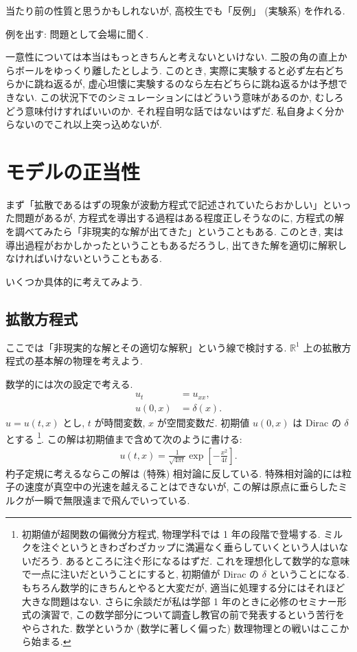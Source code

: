 \documentclass[openany, a4paper, oneside]{jsbook}
\begin{document}
当たり前の性質と思うかもしれないが, 高校生でも「反例」 (実験系) を作れる.

例を出す: 問題として会場に聞く.

一意性については本当はもっときちんと考えないといけない.
二股の角の直上からボールをゆっくり離したとしよう.
このとき, 実際に実験すると必ず左右どちらかに跳ね返るが, 虚心坦懐に実験するのなら左右どちらに跳ね返るかは予想できない.
この状況下でのシミュレーションにはどういう意味があるのか, むしろどう意味付けすればいいのか.
それ程自明な話ではないはずだ.
私自身よく分からないのでこれ以上突っ込めないが.
\section{モデルの正当性}

まず「拡散であるはずの現象が波動方程式で記述されていたらおかしい」といった問題があるが,
方程式を導出する過程はある程度正しそうなのに,
方程式の解を調べてみたら「非現実的な解が出てきた」ということもある.
このとき, 実は導出過程がおかしかったということもあるだろうし,
出てきた解を適切に解釈しなければいけないということもある.

いくつか具体的に考えてみよう.
\subsection{拡散方程式}

ここでは「非現実的な解とその適切な解釈」という線で検討する.
$\mathbb{R}^1$ 上の拡散方程式の基本解の物理を考えよう.

数学的には次の設定で考える.
\begin{align}
 u_t &     = u_{xx}, \\
 u (0, x) & = \delta (x).
\end{align}
$u = u (t,x)$ とし, $t$ が時間変数, $x$ が空間変数だ.
初期値 $u (0, x)$ は Dirac の $\delta$ とする \footnote{初期値が超関数の偏微分方程式, 物理学科では 1 年の段階で登場する.
ミルクを注ぐというときわざわざカップに満遍なく垂らしていくという人はいないだろう.
あるところに注ぐ形になるはずだ.
これを理想化して数学的な意味で一点に注いだということにすると,
初期値が Dirac の $\delta$ ということになる.
もちろん数学的にきちんとやると大変だが, 適当に処理する分にはそれほど大きな問題はない.
さらに余談だが私は学部 1 年のときに必修のセミナー形式の演習で,
この数学部分について調査し教官の前で発表するという苦行をやらされた.
数学というか (数学に著しく偏った) 数理物理との戦いはここから始まる.}.
この解は初期値まで含めて次のように書ける:
\begin{align}
 u (t, x) = \frac{1}{\sqrt{4 \pi t}} \exp \left[ - \frac{x^2}{4 t} \right].
\end{align}
杓子定規に考えるならこの解は (特殊) 相対論に反している.
特殊相対論的には粒子の速度が真空中の光速を越えることはできないが,
この解は原点に垂らしたミルクが一瞬で無限遠まで飛んでいっている.
\end{document}

